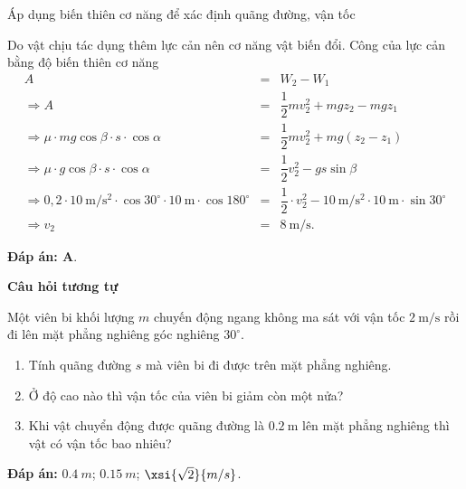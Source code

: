 \begin{dang}{Áp dụng biến thiên cơ năng để xác định quãng đường, vận tốc}
{		Do vật chịu tác dụng thêm lực cản nên cơ năng vật biến đổi. Công của lực cản bằng độ biến thiên cơ năng
		\begin{eqnarray*}
			A&=&W_2-W_1\\
			\Rightarrow A &=& \dfrac{1}{2}mv_2^2+mgz_2 - mgz_1\\
			\Rightarrow \mu\cdot  mg\cos\beta \cdot s \cdot \cos\alpha &=& \dfrac{1}{2}mv_2^2+mg(z_2 - z_1)\\
			\Rightarrow \mu\cdot  g\cos\beta \cdot s \cdot \cos\alpha &=& \dfrac{1}{2}v_2^2 - g s\sin\beta\\
			\Rightarrow 0,2 \cdot \SI{10}{\meter/\second^2} \cdot \cos 30^\circ \cdot \SI{10}{\meter} \cdot \cos 180^\circ &=& \dfrac{1}{2}\cdot v_2^2 -\SI{10}{\meter/\second^2}\cdot \SI{10}{\meter} \cdot\sin30^\circ\\
			\Rightarrow v_2 &=& \SI{8}{\meter/\second}.
		\end{eqnarray*}
		
		\textbf{Đáp án: A}.
		
		\begin{center}
			\textbf{Câu hỏi tương tự}
		\end{center}
		
		Một viên bi khối lượng $m$ chuyến động ngang không ma sát với vận tốc $\SI{2}{\meter/\second}$ rồi đi lên mặt phẳng nghiêng góc nghiêng $30^\circ$.
		\begin{enumerate}[label=\alph*)]
			\item Tính quãng đường $s$ mà viên bi đi được trên mặt phẳng nghiêng.
			\item Ở độ cao nào thì vận tốc của viên bi giảm còn một nửa?
			\item Khi vật chuyển động được quãng đường là $\SI{0,2}{\meter}$ lên mặt phẳng nghiêng thì vật có vận tốc bao nhiêu?
		\end{enumerate}
		
		\textbf{Đáp án:} $\SI{0.4}{m}$; $\SI{0.15}{m}$; $\xsi{\sqrt 2}{m/s}$.
	}
	
\end{dang}

